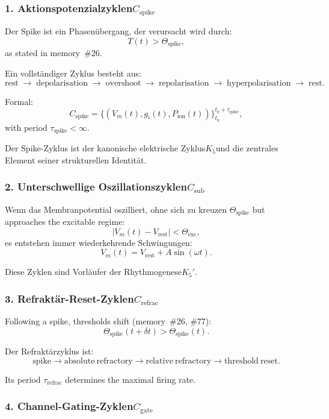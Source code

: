 \subsubsection{1. Aktionspotenzialzyklen$C_{\mathrm{spike}}$}

Der Spike ist ein Phasenübergang, der verursacht wird durch:
\[
  T(t) > \Theta_{\mathrm{spike}},
\]
as stated in memory~\#26.

Ein vollständiger Zyklus besteht aus:
\[
  \mathrm{rest} 
  \;\to\;
  \mathrm{depolarisation}
  \;\to\;
  \mathrm{overshoot}
  \;\to\;
  \mathrm{repolarisation}
  \;\to\;
  \mathrm{hyperpolarisation}
  \;\to\;
  \mathrm{rest}.
\]

Formal:
\[
  C_{\mathrm{spike}}
  =\{(V_m(t), g_i(t), P_{\mathrm{ion}}(t))\}_{t_0}^{t_0+\tau_{\mathrm{spike}}},
\]
with period $\tau_{\mathrm{spike}} < \infty$.

Der Spike-Zyklus ist der kanonische elektrische Zyklus$K_5$und die
zentrales Element seiner strukturellen Identität.

\subsubsection{2. Unterschwellige Oszillationszyklen$C_{\mathrm{sub}}$}

Wenn das Membranpotential oszilliert, ohne sich zu kreuzen
$\Theta_{\mathrm{spike}}$ but approaches the excitable regime:
\[
  |V_m(t) - V_{\mathrm{rest}}| < \Theta_{\mathrm{exc}},
\]
es entstehen immer wiederkehrende Schwingungen:
\[
  V_m(t) = V_{\mathrm{rest}} + A\sin(\omega t).
\]

Diese Zyklen sind Vorläufer der Rhythmogenese$K_5'$.

\subsubsection{3. Refraktär-Reset-Zyklen$C_{\mathrm{refrac}}$}

Following a spike, thresholds shift (memory~\#26, \#77):
\[
  \Theta_{\mathrm{spike}}(t+\delta t)
  >
  \Theta_{\mathrm{spike}}(t).
\]

Der Refraktärzyklus ist:
\[
  \mathrm{spike} 
  \to 
  \mathrm{absolute\ refractory}
  \to
  \mathrm{relative\ refractory}
  \to
  \mathrm{threshold\ reset}.
\]

Its period $\tau_{\mathrm{refrac}}$ determines the maximal firing rate.

\subsubsection{4. Channel-Gating-Zyklen$C_{\mathrm{gate}}$}

